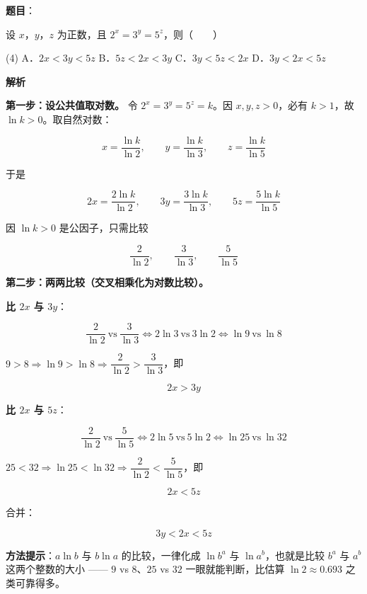 \begin{answer}

\textbf{题目}：

设 $x$，$y$，$z$ 为正数，且 $2^{x}=3^{y}=5^{z}$，则\mbox{（　　）}

\begin{gkopts}(4)
\task A．$2x<3y<5z$
\task B．$5z<2x<3y$
\task C．$3y<5z<2x$
\task D．$3y<2x<5z$
\end{gkopts}

\textbf{解析}

\textbf{第一步：设公共值取对数。} 令 $2^{x}=3^{y}=5^{z}=k$。因 $x,y,z>0$，必有 $k>1$，故 $\ln k>0$。取自然对数：

\nopagebreak[4]
\[x=\frac{\ln k}{\ln2},\qquad y=\frac{\ln k}{\ln3},\qquad z=\frac{\ln k}{\ln5}\]

于是

\nopagebreak[4]
\[2x=\frac{2\ln k}{\ln2},\qquad 3y=\frac{3\ln k}{\ln3},\qquad 5z=\frac{5\ln k}{\ln5}\]

因 $\ln k>0$ 是公因子，只需比较

\nopagebreak[4]
\[\frac2{\ln2},\qquad \frac3{\ln3},\qquad \frac5{\ln5}\]

\textbf{第二步：两两比较（交叉相乘化为对数比较）。}

\textbf{比 $2x$ 与 $3y$}：

\nopagebreak[4]
\[\frac2{\ln2}\ \text{vs}\ \frac3{\ln3}\iff 2\ln3\ \text{vs}\ 3\ln2\iff \ln9\ \text{vs}\ \ln8\]

$9>8\Rightarrow\ln9>\ln8\Rightarrow\dfrac2{\ln2}>\dfrac3{\ln3}$，即

\nopagebreak[4]
\[2x>3y\]

\textbf{比 $2x$ 与 $5z$}：

\nopagebreak[4]
\[\frac2{\ln2}\ \text{vs}\ \frac5{\ln5}\iff 2\ln5\ \text{vs}\ 5\ln2\iff \ln25\ \text{vs}\ \ln32\]

$25<32\Rightarrow\ln25<\ln32\Rightarrow\dfrac2{\ln2}<\dfrac5{\ln5}$，即

\nopagebreak[4]
\[2x<5z\]

合并：

\nopagebreak[4]
\[3y<2x<5z\]

\begin{gktip}
\textbf{方法提示}：$a\ln b$ 与 $b\ln a$ 的比较，一律化成 $\ln b^{a}$ 与 $\ln a^{b}$，也就是比较 $b^{a}$ 与 $a^{b}$ 这两个整数的大小 —— $9$ vs $8$、$25$ vs $32$ 一眼就能判断，比估算 $\ln2\approx0.693$ 之类可靠得多。
\end{gktip}


\par\medskip

\end{answer}
